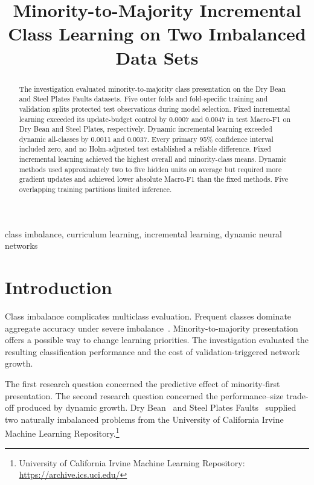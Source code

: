 \documentclass[conference,10pt]{IEEEtran}
\title{Minority-to-Majority Incremental Class Learning on Two Imbalanced Data Sets}
\author{\IEEEauthorblockN{PLACEHOLDER AUTHOR}
\IEEEauthorblockA{Student number: PLACEHOLDER STUDENT NUMBER\\
PLACEHOLDER INSTITUTION\\Module: PLACEHOLDER MODULE\\
Repository: \url{PLACEHOLDER HTTPS REPOSITORY URL}}}
\begin{document}
\nocite{bengio2009curriculum,buscema2010steel,he2009learning,koklu2020multiclass,parisi2019continual,sokolova2009systematic,yoon2018den}
\maketitle

\begin{abstract}
The investigation evaluated minority-to-majority class presentation on the Dry Bean and Steel Plates Faults datasets. Five outer folds and fold-specific training and validation splits protected test observations during model selection. Fixed incremental learning exceeded its update-budget control by 0.0007 and 0.0047 in test Macro-F1 on Dry Bean and Steel Plates, respectively. Dynamic incremental learning exceeded dynamic all-classes by 0.0011 and 0.0037. Every primary 95\% confidence interval included zero, and no Holm-adjusted test established a reliable difference. Fixed incremental learning achieved the highest overall and minority-class means. Dynamic methods used approximately two to five hidden units on average but required more gradient updates and achieved lower absolute Macro-F1 than the fixed methods. Five overlapping training partitions limited inference.
\end{abstract}
\begin{IEEEkeywords}class imbalance, curriculum learning, incremental learning, dynamic neural networks\end{IEEEkeywords}

\section{Introduction}
Class imbalance complicates multiclass evaluation. Frequent classes dominate aggregate accuracy under severe imbalance~\cite{he2009learning}. Minority-to-majority presentation offers a possible way to change learning priorities. The investigation evaluated the resulting classification performance and the cost of validation-triggered network growth.

The first research question concerned the predictive effect of minority-first presentation. The second research question concerned the performance--size trade-off produced by dynamic growth. Dry Bean~\cite{koklu2020multiclass} and Steel Plates Faults~\cite{buscema2010steel} supplied two naturally imbalanced problems from the University of California Irvine Machine Learning Repository.\footnote{University of California Irvine Machine Learning Repository: \url{https://archive.ics.uci.edu/}}
\end{document}
